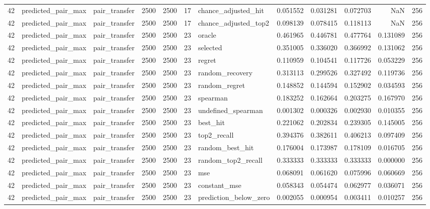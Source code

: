 \begin{tabular}{rllrrrlrrrrr}
42 & predicted_pair_max & pair_transfer & 2500 & 2500 & 17 & chance_adjusted_hit & 0.051552 & 0.031281 & 0.072703 & NaN & 256 \\
42 & predicted_pair_max & pair_transfer & 2500 & 2500 & 17 & chance_adjusted_top2 & 0.098139 & 0.078415 & 0.118113 & NaN & 256 \\
42 & predicted_pair_max & pair_transfer & 2500 & 2500 & 23 & oracle & 0.461965 & 0.446781 & 0.477764 & 0.131089 & 256 \\
42 & predicted_pair_max & pair_transfer & 2500 & 2500 & 23 & selected & 0.351005 & 0.336020 & 0.366992 & 0.131062 & 256 \\
42 & predicted_pair_max & pair_transfer & 2500 & 2500 & 23 & regret & 0.110959 & 0.104541 & 0.117726 & 0.053229 & 256 \\
42 & predicted_pair_max & pair_transfer & 2500 & 2500 & 23 & random_recovery & 0.313113 & 0.299526 & 0.327492 & 0.119736 & 256 \\
42 & predicted_pair_max & pair_transfer & 2500 & 2500 & 23 & random_regret & 0.148852 & 0.144594 & 0.152902 & 0.034593 & 256 \\
42 & predicted_pair_max & pair_transfer & 2500 & 2500 & 23 & spearman & 0.183252 & 0.162664 & 0.203275 & 0.167970 & 256 \\
42 & predicted_pair_max & pair_transfer & 2500 & 2500 & 23 & undefined_spearman & 0.001302 & 0.000326 & 0.002930 & 0.010355 & 256 \\
42 & predicted_pair_max & pair_transfer & 2500 & 2500 & 23 & best_hit & 0.221062 & 0.202834 & 0.239305 & 0.145005 & 256 \\
42 & predicted_pair_max & pair_transfer & 2500 & 2500 & 23 & top2_recall & 0.394376 & 0.382611 & 0.406213 & 0.097409 & 256 \\
42 & predicted_pair_max & pair_transfer & 2500 & 2500 & 23 & random_best_hit & 0.176004 & 0.173987 & 0.178109 & 0.016705 & 256 \\
42 & predicted_pair_max & pair_transfer & 2500 & 2500 & 23 & random_top2_recall & 0.333333 & 0.333333 & 0.333333 & 0.000000 & 256 \\
42 & predicted_pair_max & pair_transfer & 2500 & 2500 & 23 & mse & 0.068091 & 0.061620 & 0.075996 & 0.060669 & 256 \\
42 & predicted_pair_max & pair_transfer & 2500 & 2500 & 23 & constant_mse & 0.058343 & 0.054474 & 0.062977 & 0.036071 & 256 \\
42 & predicted_pair_max & pair_transfer & 2500 & 2500 & 23 & prediction_below_zero & 0.002055 & 0.000954 & 0.003411 & 0.010257 & 256 \\

\end{tabular}
